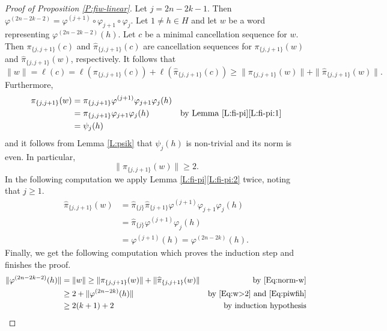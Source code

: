 \documentclass[12pt,reqno,a4paper]{article}
\theoremstyle{definition}
\theoremstyle{remark}
\numberwithin{equation}{section}
\numberwithin{figure}{section}
\begin{document}
\begin{proof}[Proof of Proposition \ref{P:fiw-linear}]
Let $j=2n-2k-1$. 
Then 
$\varphi^{(2n-2k-2)} = \varphi^{(j+1)}\circ\varphi_{j+1}\circ\varphi_j$.
Let $1\neq h\in H$ and let $w$ be a word representing $\varphi^{(2n-2k-2)}(h)$.
Let $c$ be a minimal cancellation sequence for $w$. Then
$\pi_{\{j,j+1\}}(c)$ and $\widehat{\pi}_{\{j,j+1\}}(c)$ are cancellation
sequences for 
$\pi_{\{j,j+1\}}(w)$ and $\widehat{\pi}_{\{j,j+1\}}(w)$, respectively.
It follows that
\begin{equation}
\|w\| = \ell(c) = 
\ell(\pi_{\{j,j+1\}}(c))+ \ell(\widehat{\pi}_{\{j,j+1\}}(c))
\geq \|\pi_{\{j,j+1\}}(w)\|+ \|\widehat{\pi}_{\{j,j+1\}}(w)\|.
\label{Eq:norm-w}
\end{equation}
Furthermore,
\begin{align*}
\pi_{\{j,j+1\}}(w) 
&= \pi_{\{j,j+1\}}\varphi^{(j+1)}\varphi_{j+1}\varphi_j(h)\\
&= \pi_{\{j,j+1\}}\varphi_{j+1}\varphi_j(h) &\text{by Lemma \ref{L:fi-pi}\ref{L:fi-pi:1}}\\
&=\psi_j(h)
\end{align*}
and it follows from Lemma \ref{L:psik} that $\psi_j(h)$ is non-trivial
and its norm is even.
In particular, 
\begin{equation}
\|\pi_{\{j,j+1\}}(w)\|\geq 2.
\label{Eq:w>2}
\end{equation}
In the following computation we apply Lemma \ref{L:fi-pi}\ref{L:fi-pi:2}
twice, noting that $j \geq 1$.
\begin{align}
\widehat{\pi}_{\{j,j+1\}}(w) 
&=\widehat{\pi}_{\{j\}}\widehat{\pi}_{\{j+1\}}
\varphi^{(j+1)}\varphi_{j+1}\varphi_j(h)\nonumber\\
&=\widehat{\pi}_{\{j\}}\varphi^{(j+1)}\varphi_j(h)\nonumber \\
&=\varphi^{(j+1)}(h)=\varphi^{(2n-2k)}(h).
\label{Eq:piwfih}
\end{align}
Finally, we get the following computation which proves the induction step and finishes
the proof.
\begin{align*}
\|\varphi^{(2n-2k-2)}(h)\|
&=\|w\| 
\geq \|\pi_{\{j,j+1\}}(w)\|+ \|\widehat{\pi}_{\{j,j+1\}}(w)\| &\text{by \eqref{Eq:norm-w}}\\
&\geq 2 + \|\varphi^{(2n-2k)}(h)\| &\text{by \eqref{Eq:w>2} and \eqref{Eq:piwfih}}\\
&\geq 
2(k+1)+2 
&\text{by induction hypothesis}
\end{align*}
\end{proof}
\end{document}
